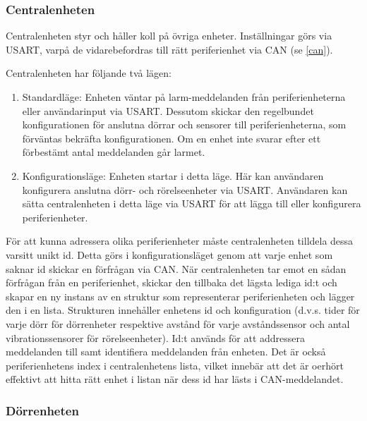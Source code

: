 \documentclass{article}
\begin{document}
\subsubsection{Centralenheten}
Centralenheten styr och håller koll på övriga enheter.
 Inställningar görs via USART, varpå de vidarebefordras till rätt
  periferienhet via CAN (se \ref{can}).

Centralenheten har följande två lägen:

\begin{enumerate}
    \item Standardläge: Enheten väntar på larm-meddelanden från
    periferienheterna eller användarinput via USART. Dessutom
    skickar den regelbundet  konfigurationen för anslutna
    dörrar och sensorer till periferienheterna, som förväntas
    bekräfta konfigurationen. Om en enhet inte svarar efter
    ett förbestämt antal meddelanden går larmet.
    \item Konfigurationsläge: Enheten startar i detta läge.
     Här kan användaren konfigurera anslutna dörr- och
     rörelseenheter via USART. Användaren kan sätta centralenheten
      i detta läge via USART för att lägga till eller konfigurera
       periferienheter.
\end{enumerate}

För att kunna adressera olika periferienheter måste centralenheten
tilldela dessa varsitt unikt id. Detta görs i konfigurationsläget
genom att varje enhet som saknar id skickar en förfrågan via CAN.
När centralenheten tar emot en sådan förfrågan från en periferienhet,
skickar den tillbaka det lägsta lediga id:t och skapar en ny instans
av en struktur som representerar periferienheten och lägger den i en
lista. Strukturen innehåller enhetens id och konfiguration (d.v.s.
tider för varje dörr för dörrenheter respektive avstånd för varje
avståndssensor och antal vibrationssensorer för rörelseenheter).
Id:t används för att addressera meddelanden till samt identifiera
meddelanden från enheten. Det är också periferienhetens index i
centralenhetens lista, vilket innebär att det är oerhört effektivt
att hitta rätt enhet i listan när dess id har lästs i CAN-meddelandet.





\subsubsection{Dörrenheten}
\end{document}
